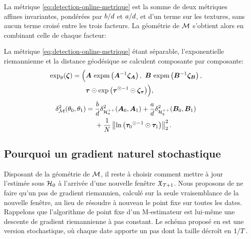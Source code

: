 La métrique \cref{eq:detection-online-metrique} est la somme de deux métriques affines invariantes, pondérées par $b/d$ et $a/d$, et d'un terme sur les textures, sans aucun terme croisé entre les trois facteurs. La géométrie de $\mathcal{M}$ s'obtient alors en combinant celle de chaque facteur:

\begin{property}
\label{prop:detection-online-expdist}
  La métrique \cref{eq:detection-online-metrique} étant séparable, l'exponentielle riemannienne et la distance géodésique se calculent composante par composante:
  \begin{equation}
    \begin{aligned}
      \exp_{\theta}(\boldsymbol{\zeta})
      ={}&
      \Big(
        \boldsymbol{A}\,\operatorname{\operatorname{expm}}\left({\boldsymbol{A}}^{-1}\boldsymbol{\zeta}_{\boldsymbol{A}}\right),\
        \boldsymbol{B}\,\operatorname{\operatorname{expm}}\left({\boldsymbol{B}}^{-1}\boldsymbol{\zeta}_{\boldsymbol{B}}\right),
      \\
      &\phantom{\Big(}\boldsymbol{\tau}\odot\exp\big({\boldsymbol{\tau}}^{\odot-1}\odot\boldsymbol{\zeta}_{\boldsymbol{\tau}}\big)
      \Big),
    \end{aligned}
    \label{eq:detection-online-exp}
  \end{equation}
  \begin{equation}
    \begin{aligned}
      \delta^2_{\mathcal{M}}(\theta_0,\theta_1)
      ={}&
      \frac{b}{d}\delta^2_{\mathcal{H}_{a}^{++}}(\boldsymbol{A}_0,\boldsymbol{A}_1)
      + \frac{a}{d}\delta^2_{\mathcal{H}_{b}^{++}}(\boldsymbol{B}_0,\boldsymbol{B}_1)
      \\
      &+ \frac{1}{N}\left\lVert\ln\left({\boldsymbol{\tau}_0}^{\odot-1}\odot\boldsymbol{\tau}_1\right)\right\rVert_2^2.
    \end{aligned}
    \label{eq:detection-online-dist}
  \end{equation}
\end{property}

\subsection{Pourquoi un gradient naturel stochastique}

Disposant de la géométrie de $\mathcal{M}$, il reste à choisir comment mettre à jour l'estimée sous $\mathcal{H}_0$ à l'arrivée d'une nouvelle fenêtre $\mathfrak{X}_{T+1}$. Nous proposons de ne faire qu'un pas de gradient riemannien, calculé sur la seule vraisemblance de la nouvelle fenêtre, au lieu de résoudre à nouveau le point fixe sur toutes les dates. Rappelons que l'algorithme de point fixe d'un M-estimateur est lui-même une descente de gradient riemannienne à pas constant. Le schéma proposé en est une version stochastique, où chaque date apporte un pas dont la taille décroît en $1/T$.

